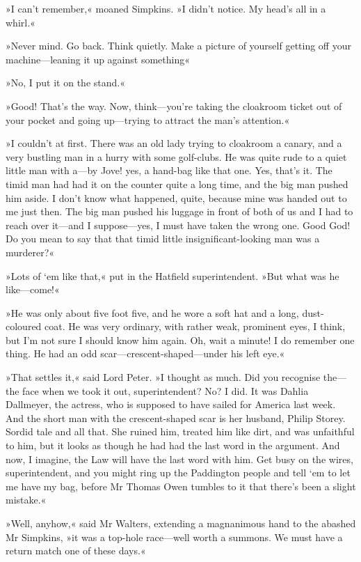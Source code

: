 »I can't remember,« moaned Simpkins. »I didn't notice. My head's all in a whirl.«

»Never mind. Go back. Think quietly. Make a picture of yourself getting off your machine—leaning it up against something\longdash«

»No, I put it on the stand.«

»Good! That's the way. Now, think—you're taking the cloakroom ticket out of your pocket and going up—trying to attract the man's attention.«

»I couldn't at first. There was an old lady trying to cloakroom a canary, and a very bustling man in a hurry with some golf-clubs. He was quite rude to a quiet little man with a—by Jove! yes, a hand-bag like that one. Yes, that's it. The timid man had had it on the counter quite a long time, and the big man pushed him aside. I don't know what happened, quite, because mine was handed out to me just then. The big man pushed his luggage in front of both of us and I had to reach over it—and I suppose—yes, I must have taken the wrong one. Good God! Do you mean to say that that timid little insignificant-looking man was a murderer?«

»Lots of `em like that,« put in the Hatfield superintendent. »But what was he like—come!«

»He was only about five foot five, and he wore a soft hat and a long, dust-coloured coat. He was very ordinary, with rather weak, prominent eyes, I think, but I'm not sure I should know him again. Oh, wait a minute! I do remember one thing. He had an odd scar—crescent-shaped—under his left eye.«

»That settles it,« said Lord Peter. »I thought as much. Did you recognise the—the face when we took it out, superintendent? No? I did. It was Dahlia Dallmeyer, the actress, who is supposed to have sailed for America last week. And the short man with the crescent-shaped scar is her husband, Philip Storey. Sordid tale and all that. She ruined him, treated him like dirt, and was unfaithful to him, but it looks as though he had had the last word in the argument. And now, I imagine, the Law will have the last word with him. Get busy on the wires, superintendent, and you might ring up the Paddington people and tell `em to let me have my bag, before Mr Thomas Owen tumbles to it that there's been a slight mistake.«

»Well, anyhow,« said Mr Walters, extending a magnanimous hand to the abashed Mr Simpkins, »it was a top-hole race—well worth a summons. We must have a return match one of these days.«

